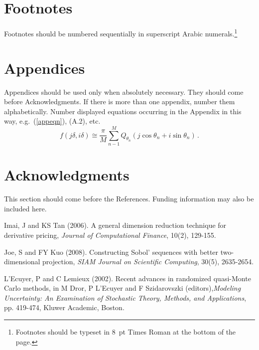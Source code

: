 \documentclass{ws-ijm}
\begin{document}
\section{Footnotes}
Footnotes should be numbered sequentially in superscript Arabic
numerals.\footnote{Footnotes should be typeset in 8~pt Times Roman
at the bottom of the page.}

\appendix

\section{Appendices}

Appendices should be used only when absolutely necessary. They
should come before Acknowledgments. If there is more than one
appendix, number them alphabetically.  Number displayed equations occurring in the Appendix
in this way, e.g.~(\ref{appeqn}), (A.2), etc.
\begin{equation}
f(j\delta, i\delta) \cong \frac{\pi}{M} \sum^M_{n-1}
Q_{\theta_n} (j\cos \theta_n + i\sin \theta_n)\, .\label{appeqn}
\end{equation}

\section*{Acknowledgments}
This section should come before the References. Funding
information may also be included here.

\begin{thebibliography}{0}


\bibitem{}Imai, J and KS Tan (2006). A general dimension reduction technique for derivative pricing, {\it Journal of Computational Finance}, 10(2), 129-155.

\bibitem{} Joe, S and FY Kuo (2008). Constructing Sobol' sequences with better two-dimensional projection, {\it SIAM Journal on Scientific Computing}, 30(5), 2635-2654.

\bibitem{} L'Ecuyer, P and C Lemieux (2002). Recent advances in randomized quasi-Monte Carlo methods, in M Dror, P L'Ecuyer and F Szidarovszki (editors),{\it  Modeling Uncertainty: An Examination of Stochastic Theory, Methods, and Applications}, pp. 419-474, Kluwer Academic, Boston.

\end{thebibliography}
\end{document}
